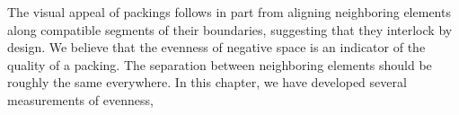 The visual appeal of packings follows in part from aligning neighboring elements along compatible 
segments of their boundaries, suggesting that they interlock by design. 
We believe that the evenness of negative space is an indicator 
of the quality of a packing.
The separation between neighboring elements should be roughly the same everywhere.
In this chapter, we have developed several measurements of evenness,

